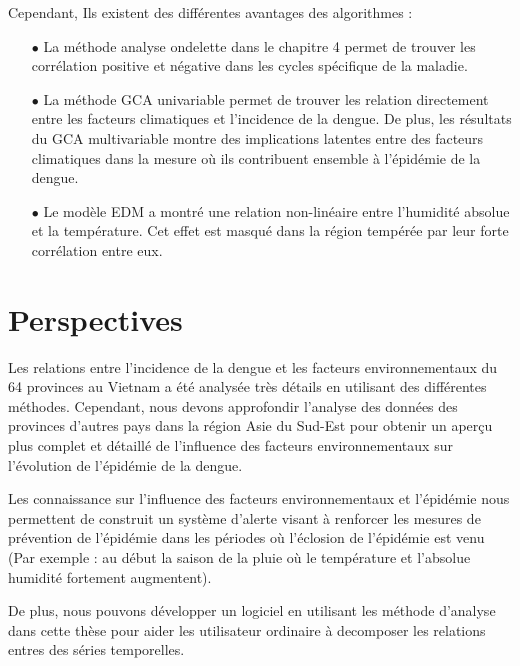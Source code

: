 Cependant, Ils existent des différentes avantages des algorithmes : 
\begin{itemize}
\item[$\bullet$] La méthode analyse ondelette dans le chapitre 4 permet de trouver les corrélation positive et négative dans les cycles spécifique de la maladie. 
\item[$\bullet$] La méthode GCA univariable permet de trouver les relation directement entre les facteurs climatiques et l'incidence de la dengue. De plus, les résultats du GCA multivariable montre des implications  latentes entre des facteurs climatiques dans la mesure où ils contribuent ensemble à l'épidémie de la dengue.
\item[$\bullet$] Le modèle EDM a montré une relation non-linéaire entre l'humidité absolue et la température. Cet effet est masqué dans la région tempérée par leur forte corrélation entre eux.
\end{itemize}

\section{Perspectives}

Les relations entre l'incidence de la dengue et les facteurs environnementaux du 64 provinces au Vietnam a été analysée très détails en utilisant des différentes méthodes. Cependant, nous devons approfondir l'analyse des données des provinces d'autres pays dans la région Asie du Sud-Est pour obtenir un aperçu plus complet et détaillé de l'influence des facteurs environnementaux sur l'évolution de l'épidémie de la dengue. 

Les connaissance sur l'influence des facteurs environnementaux et l'épidémie nous permettent de construit un système d'alerte visant à renforcer les mesures de prévention de l'épidémie dans les périodes où l'éclosion de l'épidémie est venu (Par exemple : au début la saison de la pluie où le température et l'absolue humidité fortement augmentent). 

De plus, nous pouvons développer un logiciel en utilisant les méthode d'analyse dans cette thèse pour aider les utilisateur ordinaire à decomposer les relations entres des séries temporelles. 



